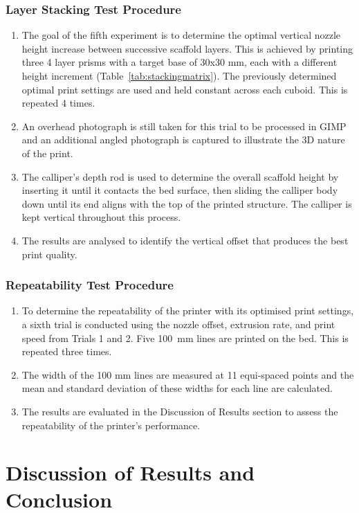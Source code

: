 \subsubsection*{Layer Stacking Test Procedure}
\begin{enumerate}
    \item The goal of the fifth experiment is to determine the optimal vertical nozzle height increase between successive scaffold layers. This is achieved by printing three 4 layer prisms with a target base of 30x30 mm, each with a different height increment (Table~\ref{tab:stackingmatrix}). The previously determined optimal print settings are used and held constant across each cuboid. This is repeated 4 times.
    \item An overhead photograph is still taken for this trial to be processed in GIMP and an additional angled photograph is captured to illustrate the 3D nature of the print.
    \item The calliper's depth rod is used to determine the overall scaffold height by inserting it until it contacts the bed surface, then sliding the calliper body down until its end aligns with the top of the printed structure. The calliper is kept vertical throughout this process.
    \item The results are analysed to identify the vertical offset that produces the best print quality.
\end{enumerate}
\subsubsection*{Repeatability Test Procedure}
\begin{enumerate}
    \item To determine the repeatability of the printer with its optimised print settings, a sixth trial is conducted using the nozzle offset, extrusion rate, and print speed from Trials 1 and 2. Five 100~mm lines are printed on the bed. This is repeated three times. 
    \item The width of the 100 mm lines are measured at 11 equi-spaced points and the mean and standard deviation of these widths for each line are calculated.
    \item The results are evaluated in the Discussion of Results section to assess the repeatability of the printer's performance.
\end{enumerate}


\section{Discussion of Results and Conclusion}
